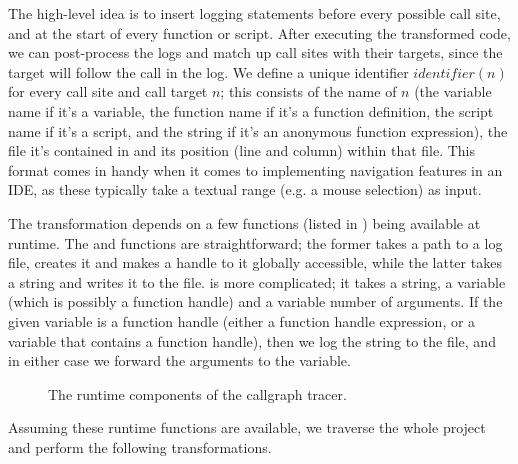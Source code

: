 The high-level idea is to insert logging statements before every possible call
site, and at the start of every function or script. After executing the
transformed code, we can post-process the logs and match up call sites with
their targets, since the target will follow the call in the log. We define a
unique identifier $identifier(n)$ for every call site and call target $n$; this
consists of the name of $n$ (the variable name if it's a variable, the function
name if it's a function definition, the script name if it's a script, and the
string  if it's an anonymous function expression), the file
it's contained in and its position (line and column) within that file. This
format comes in handy when it comes to implementing navigation features in an
IDE, as these typically take a textual range (e.g. a mouse selection) as input.

The transformation depends on a few functions (listed in
) being available at runtime. The
 and  functions
are straightforward; the former takes a path to a log file, creates it and
makes a handle to it globally accessible, while the latter takes a string and
writes it to the file. \newline {} is more
complicated; it takes a string, a variable (which is possibly a function
handle) and a variable number of arguments. If the given variable is a function
handle (either a function handle expression, or a variable that contains a
function handle), then we log the string to the file, and in either case we
forward the arguments to the variable.

\begin{figure}[htbp]

\caption{The runtime components of the callgraph tracer.}
\label{Fig:CallgraphRuntime}
\end{figure}

Assuming these runtime functions are available, we traverse the whole project
and perform the following transformations.

